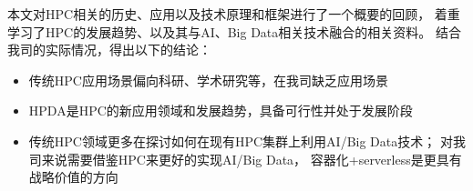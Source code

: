 本文对HPC相关的历史、应用以及技术原理和框架进行了一个概要的回顾，
着重学习了HPC的发展趋势、以及其与AI、Big Data相关技术融合的相关资料。
结合我司的实际情况，得出以下的结论：

\begin{itemize}
    \item 传统HPC应用场景偏向科研、学术研究等，在我司缺乏应用场景
    \item HPDA是HPC的新应用领域和发展趋势，具备可行性并处于发展阶段
    \item 传统HPC领域更多在探讨如何在现有HPC集群上利用AI/Big Data技术；
    对我司来说需要借鉴HPC来更好的实现AI/Big Data，
    容器化+serverless是更具有战略价值的方向
\end{itemize}